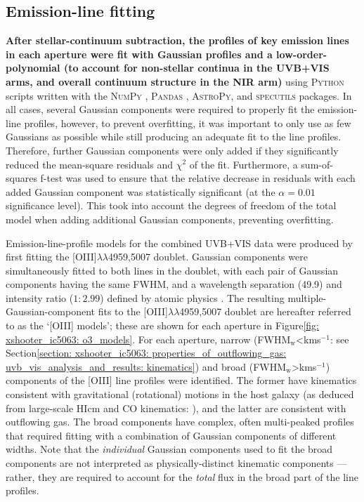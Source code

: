 \subsection{Emission-line fitting}
\label{section: xshooter_ic_5063: observations_and_data_reduction: emission_line_fitting}

\textbf{After stellar-continuum subtraction, the profiles of key emission lines in each aperture were fit with Gaussian profiles and a low-order-polynomial (to account for non-stellar continua in the UVB+VIS arms, and overall continuum structure in the NIR arm)} using \textsc{Python} scripts written with the \textsc{NumPy} \citep{Harris2020}, \textsc{Pandas} \citep{reback2020pandas}, \textsc{AstroPy}, and \textsc{specutils} packages. In all cases, several Gaussian components were required to properly fit the emission-line profiles, however, to prevent overfitting, it was important to only use as few Gaussians as possible while still producing an adequate fit to the line profiles. Therefore, further Gaussian components were only added if they significantly reduced the mean-square residuals and $\chi^2$ of the fit. Furthermore, a sum-of-squares f-test \citep{Montgomery2012} was used to ensure that the relative decrease in residuals with each added Gaussian component was statistically significant (at the $\alpha=0.01$ significance level). This took into account the degrees of freedom of the total model when adding additional Gaussian components, preventing overfitting.

Emission-line-profile models for the combined UVB+VIS data were produced by first fitting the [OIII]$\lambda\lambda$4959,5007 doublet. Gaussian components were simultaneously fitted to both lines in the doublet, with each pair of Gaussian components having the same FWHM, and a wavelength separation (49.9\;{\AA}) and intensity ratio ($1:2.99$) defined by atomic physics \citep{Osterbrock2006}. The resulting multiple-Gaussian-component fits to the [OIII]$\lambda\lambda$4959,5007 doublet are hereafter referred to as the `[OIII] models'; these are shown for each aperture in Figure\;\ref{fig: xshooter_ic5063: o3_models}. For each aperture, narrow (FWHM$_\mathrm{w}$\;\textless{}\;km\;s$^{-1}$: see Section\;\ref{section: xshooter_ic5063: properties_of_outflowing_gas: uvb_vis_analysis_and_results: kinematics}) and broad (FWHM$_\mathrm{w}$\;\textgreater{}\;km\;s$^{-1}$) components of the [OIII] line profiles were identified. The former have kinematics consistent with gravitational (rotational) motions in the host galaxy (as deduced from large-scale HI\;cm and CO kinematics: \citealt{Morganti1998, Morganti2015}), and the latter are consistent with outflowing gas. The broad components have complex, often multi-peaked profiles that required fitting with a combination of Gaussian components of different widths. Note that the \textit{individual} Gaussian components used to fit the broad components are not interpreted as physically-distinct kinematic components --- rather, they are required to account for the \textit{total} flux in the broad part of the line profiles.

